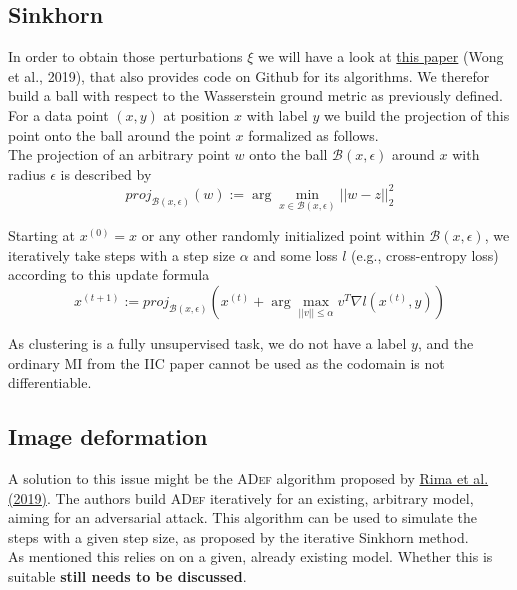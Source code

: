 \documentclass[]{article}
\begin{document}
\subsection{Sinkhorn}
In order to obtain those perturbations $\xi$ we will have a look at \href{http://proceedings.mlr.press/v97/wong19a/wong19a.pdf}{this paper} (Wong et al., 2019), that also provides code on Github for its algorithms. We therefor build a ball with respect to the Wasserstein ground metric as previously defined. For a data point $(x,y)$ at position $x$ with label $y$ we build the projection of this point onto the ball around the point $x$ formalized as follows.\\

The projection of an arbitrary point $w$ onto the ball $\mathcal{B}(x,\epsilon)$ around $x$ with radius $\epsilon$ is described by
\begin{equation}
	proj_{\mathcal{B}(x,\epsilon)}(w):=\arg \min_{x\in\mathcal{B}(x,\epsilon)}||w-z||^2_2
\end{equation}

Starting at $x^{(0)}=x$ or any other randomly initialized point within $\mathcal{B}(x,\epsilon)$, we iteratively take steps with a step size $\alpha$ and some loss $l$ (e.g., cross-entropy loss) according to this update formula
\begin{equation}
	x^{(t+1)} := proj_{\mathcal{B}(x,\epsilon)} (x^{(t)} + \arg \max_{||v||\leq\alpha}v^T\nabla l(x^{(t)},y))
\end{equation}

As clustering is a fully unsupervised task, we do not have a label $y$, and the ordinary MI from the IIC paper cannot be used as the codomain is not differentiable.

\subsection{Image deformation}
A solution to this issue might be the \textsc{ADef} algorithm proposed by \href{https://openreview.net/pdf?id=Hk4dFjR5K7}{Rima et al. (2019)}. The authors build \textsc{ADef} iteratively for an existing, arbitrary model, aiming for an adversarial attack. This algorithm can be used to simulate the steps with a given step size, as proposed by the iterative Sinkhorn method.  \\

As mentioned this relies on on a given, already existing model. Whether this is suitable \textbf{still needs to be discussed}.
\end{document}
